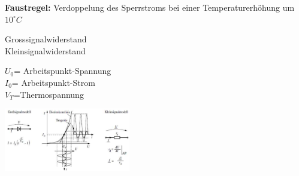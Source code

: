                 {\bf Faustregel:} Verdoppelung des Sperrstroms bei einer Temperaturerh\"ohung um $10 ^\circ C$
            
            \begin{minipage}[T]{8.5cm}
                Grosssignalwiderstand
                \hspace{8mm}\\
                Kleinsignalwiderstand
                \hspace{8.4mm}\\
            \end{minipage}
            \begin{minipage}{5cm}
                $U_0$= Arbeitspunkt-Spannung\\
                $I_0$= Arbeitspunkt-Strom\\
                $V_T$=Thermospannung
            \end{minipage}
            \begin{minipage}{5.5cm}
                \includegraphics[width=5.5cm]{./bilder/GrossKleinSig}\\
            \end{minipage}
\newpage            

